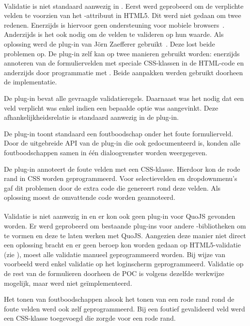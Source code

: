\paragraph{\jqm}
Validatie is niet standaard aanwezig in \jqm. 
Eerst werd geprobeerd om de verplichte velden te voorzien van het -attribuut in HTML5. 
Dit werd niet gedaan om twee redenen.
Enerzijds is hiervoor geen ondersteuning voor mobiele browsers~\cite{Deveria2013c}. 
Anderzijds is het ook nodig om de velden te valideren op hun waarde.
Als oplossing werd de plug-in van Jörn Zaefferer gebruikt~\cite{Zaefferer2013}. 
Deze lost beide problemen op.
De plug-in zelf kan op twee manieren gebruikt worden: enerzijds annoteren van de formuliervelden met speciale CSS-klassen in de HTML-code en anderzijds door programmatie met \js{}. 
Beide aanpakken werden gebruikt doorheen de implementatie. 

De plug-in bevat alle gevraagde validatieregels.
Daarnaast was het nodig dat een veld verplicht was enkel indien een bepaalde optie was aangevinkt.
Deze afhankelijkheidsrelatie is standaard aanwezig in de plug-in.

De plug-in toont standaard een foutboodschap onder het foute formulierveld.
Door de uitgebreide API van de plug-in die ook gedocumenteerd is, konden alle foutboodschappen samen in één dialoogvenster worden weergegeven.

De plug-in annoteert de foute velden met een CSS-klasse.
Hierdoor kon de rode rand in CSS worden geprogrammeerd. 
Voor selectievelden en dropdownmenu's gaf dit problemen door de extra code die \jqm{} genereert rond deze velden.
Als oplossing moest de omvattende code worden geannoteerd.

\paragraph{\lungo}
Validatie is niet aanwezig in \lungo{} en er kon ook geen plug-in voor QuoJS gevonden worden.
Er werd geprobeerd om bestaande plug-ins voor andere \js{}-bibliotheken om te vormen en deze te laten werken met QuoJS.
Aangezien deze manier niet direct een oplossing bracht en er geen beroep kon worden gedaan op HTML5-validatie (zie \jqm{}), moest alle validatie manueel geprogrammeerd worden. 
Bij wijze van voorbeeld werd enkel validatie op het loginscherm geprogrammeerd.
Validatie op de rest van de formulieren doorheen de POC is volgens dezelfde werkwijze mogelijk, maar werd niet geïmplementeerd.

Het tonen van foutboodschappen alsook het tonen van een rode rand rond de foute velden werd ook zelf geprogrammeerd.
Bij een foutief gevalideerd veld werd een CSS-klasse toegevoegd die zorgde voor een rode rand.


